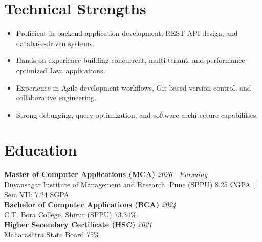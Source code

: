 \documentclass[10.5pt,a4paper]{article}
\begin{document}
\section{Technical Strengths}
\begin{itemize}
  \item Proficient in backend application development, REST API design, and database-driven systems.
  \item Hands-on experience building concurrent, multi-tenant, and performance-optimized Java applications.
  \item Experience in Agile development workflows, Git-based version control, and collaborative engineering.
  \item Strong debugging, query optimization, and software architecture capabilities.
\end{itemize}
\section{Education}
\textbf{Master of Computer Applications (MCA)} \hfill \textit{2026 $|$ Pursuing}\\
Dnyansagar Institute of Management and Research, Pune (SPPU) \hfill 8.25 CGPA | Sem VII: 7.24 SGPA\\[4pt]
\textbf{Bachelor of Computer Applications (BCA)} \hfill \textit{2024}\\
C.T. Bora College, Shirur (SPPU) \hfill 73.34\%\\[4pt]
\textbf{Higher Secondary Certificate (HSC)} \hfill \textit{2021}\\
Maharashtra State Board \hfill 75\%\\[4pt]
\end{document}

